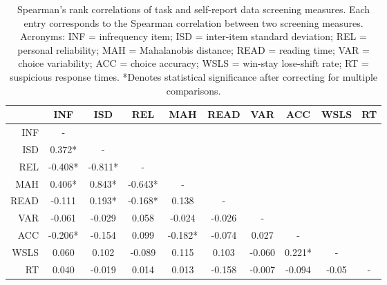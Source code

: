 \documentclass[a4paper,notitlepage,12pt]{article}
\begin{document}
\begin{table}[h!]
\centering
\small
\begin{tabular}{rccccccccc}
\toprule
{} &      INF &      ISD &      REL &      MAH &    READ &     VAR &     ACC &   WSLS & RT \\
\midrule
INF  &        - &          &          &          &         &         &         &        &    \\
ISD  &   0.372* &        - &          &          &         &         &         &        &    \\
REL  &  -0.408* &  -0.811* &        - &          &         &         &         &        &    \\
MAH  &   0.406* &   0.843* &  -0.643* &        - &         &         &         &        &    \\
READ &   -0.111 &   0.193* &  -0.168* &    0.138 &       - &         &         &        &    \\
VAR  &   -0.061 &   -0.029 &    0.058 &   -0.024 &  -0.026 &       - &         &        &    \\
ACC  &  -0.206* &   -0.154 &    0.099 &  -0.182* &  -0.074 &   0.027 &       - &        &    \\
WSLS &    0.060 &    0.102 &   -0.089 &    0.115 &   0.103 &  -0.060 &  0.221* &      - &    \\
RT   &    0.040 &   -0.019 &    0.014 &    0.013 &  -0.158 &  -0.007 &  -0.094 &  -0.05 &  - \\
\bottomrule
\end{tabular}
\captionsetup{width=0.88\textwidth}
\caption{Spearman's rank correlations of task and self-report data screening measures. Each entry corresponds to the Spearman correlation between two screening measures. Acronyms: INF = infrequency item; ISD = inter-item standard deviation; REL = personal reliability; MAH = Mahalanobis distance; READ = reading time; VAR = choice variability; ACC = choice accuracy; WSLS = win-stay lose-shift rate; RT = suspicious response times. *Denotes statistical significance after correcting for multiple comparisons.}
\end{table}
\end{document}
